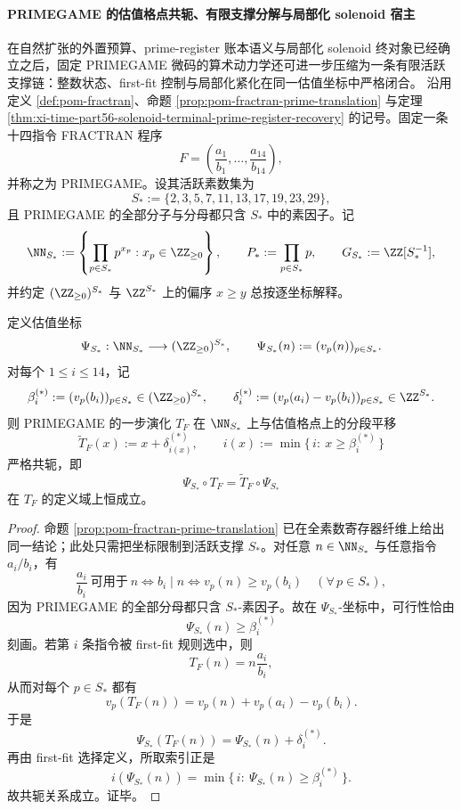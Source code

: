 \paragraph{PRIMEGAME 的估值格点共轭、有限支撑分解与局部化 solenoid 宿主}
在自然扩张的外置预算、prime-register 账本语义与局部化 solenoid 终对象已经确立之后，固定 PRIMEGAME 微码的算术动力学还可进一步压缩为一条有限活跃支撑链：整数状态、first-fit 控制与局部化紧化在同一估值坐标中严格闭合。
沿用定义 \ref{def:pom-fractran}、命题 \ref{prop:pom-fractran-prime-translation} 与定理 \ref{thm:xi-time-part56-solenoid-terminal-prime-register-recovery} 的记号。固定一条十四指令 FRACTRAN 程序
\[
F=\left(\frac{a_1}{b_1},\dots,\frac{a_{14}}{b_{14}}\right),
\]
并称之为 PRIMEGAME。设其活跃素数集为
\[
S_*:=\{2,3,5,7,11,13,17,19,23,29\},
\]
且 PRIMEGAME 的全部分子与分母都只含 \(S_*\) 中的素因子。记
\[
\NN_{S_*}:=\left\{\prod_{p\in S_*}p^{x_p}:x_p\in \ZZ_{\ge 0}\right\},
\qquad
P_*:=\prod_{p\in S_*}p,
\qquad
G_{S_*}:=\ZZ[S_*^{-1}],
\]
并约定 \((\ZZ_{\ge 0})^{S_*}\) 与 \(\ZZ^{S_*}\) 上的偏序 \(x\ge y\) 总按逐坐标解释。

\begin{theorem}\label{thm:xi-time-part62ae-primegame-exact-prime-register-conjugacy}
定义估值坐标
\[
\Psi_{S_*}:\NN_{S_*}\longrightarrow (\ZZ_{\ge 0})^{S_*},
\qquad
\Psi_{S_*}(n):=(v_p(n))_{p\in S_*}.
\]
对每个 \(1\le i\le 14\)，记
\[
\beta_i^{(*)}:=(v_p(b_i))_{p\in S_*}\in (\ZZ_{\ge 0})^{S_*},
\qquad
\delta_i^{(*)}:=(v_p(a_i)-v_p(b_i))_{p\in S_*}\in \ZZ^{S_*}.
\]
则 PRIMEGAME 的一步演化 \(T_F\) 在 \(\NN_{S_*}\) 上与估值格点上的分段平移
\[
\widetilde T_F(x):=x+\delta_{i(x)}^{(*)},
\qquad
i(x):=\min\{\,i:\ x\ge \beta_i^{(*)}\,\}
\]
严格共轭，即
\[
\Psi_{S_*}\circ T_F=\widetilde T_F\circ \Psi_{S_*}
\]
在 \(T_F\) 的定义域上恒成立。
\end{theorem}
\begin{proof}
命题 \ref{prop:pom-fractran-prime-translation} 已在全素数寄存器纤维上给出同一结论；此处只需把坐标限制到活跃支撑 \(S_*\)。对任意 \(n\in \NN_{S_*}\) 与任意指令 \(a_i/b_i\)，有
\[
\frac{a_i}{b_i}\ \text{可用于}\ n
\iff
b_i\mid n
\iff
v_p(n)\ge v_p(b_i)\quad(\forall\, p\in S_*),
\]
因为 PRIMEGAME 的全部分母都只含 \(S_*\)-素因子。故在 \(\Psi_{S_*}\)-坐标中，可行性恰由
\[
\Psi_{S_*}(n)\ge \beta_i^{(*)}
\]
刻画。若第 \(i\) 条指令被 first-fit 规则选中，则
\[
T_F(n)=n\frac{a_i}{b_i},
\]
从而对每个 \(p\in S_*\) 都有
\[
v_p(T_F(n))=v_p(n)+v_p(a_i)-v_p(b_i).
\]
于是
\[
\Psi_{S_*}(T_F(n))
=
\Psi_{S_*}(n)+\delta_i^{(*)}.
\]
再由 first-fit 选择定义，所取索引正是
\[
i(\Psi_{S_*}(n))
=
\min\{\,i:\ \Psi_{S_*}(n)\ge \beta_i^{(*)}\,\}.
\]
故共轭关系成立。证毕。
\end{proof}

